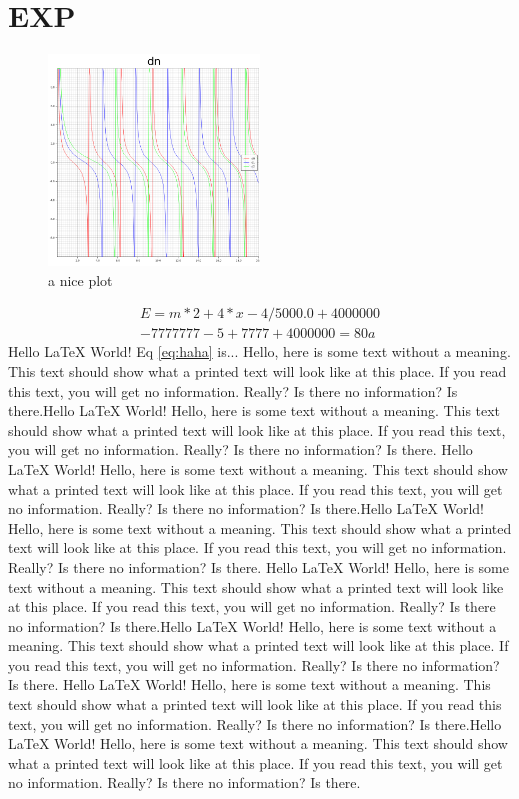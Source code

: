 \documentclass{article}
\begin{document}
\section{EXP}
\begin{figure}[h]
    \centering
    \includegraphics[width=0.5\textwidth, height=0.25\textheight]{dn.png}
    \caption{a nice plot}
    \label{fig:dn_plot}
\end{figure}
\begin{equation} \label{eq:haha}
\begin{aligned}
    E = m*2+4*x-4 / 5000.0 + 4000000 \\
    - 7777777 - 5 + 7777 + 4000000= 80a
\end{aligned}
\end{equation}
Hello LaTeX World! Eq \ref{eq:haha} is...
Hello, here is some text without a meaning. This text should show what a printed text will look like at this place.
If you read this text, you will get no information. Really? Is there no information? Is there.Hello LaTeX World!
Hello, here is some text without a meaning. This text should show what a printed text will look like at this place.
If you read this text, you will get no information. Really? Is there no information? Is there.
Hello LaTeX World!
Hello, here is some text without a meaning. This text should show what a printed text will look like at this place.
If you read this text, you will get no information. Really? Is there no information? Is there.Hello LaTeX World!
Hello, here is some text without a meaning. This text should show what a printed text will look like at this place.
If you read this text, you will get no information. Really? Is there no information? Is there.
Hello LaTeX World!
Hello, here is some text without a meaning. This text should show what a printed text will look like at this place.
If you read this text, you will get no information. Really? Is there no information? Is there.Hello LaTeX World!
Hello, here is some text without a meaning. This text should show what a printed text will look like at this place.
If you read this text, you will get no information. Really? Is there no information? Is there.
Hello LaTeX World!
Hello, here is some text without a meaning. This text should show what a printed text will look like at this place.
If you read this text, you will get no information. Really? Is there no information? Is there.Hello LaTeX World!
Hello, here is some text without a meaning. This text should show what a printed text will look like at this place.
If you read this text, you will get no information. Really? Is there no information? Is there.
\end{document}
